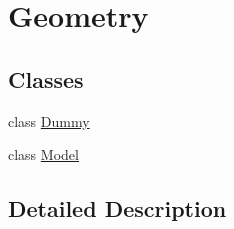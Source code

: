 \hypertarget{group__gr___geometry}{}\section{Geometry}
\label{group__gr___geometry}
\subsection*{Classes}
\begin{DoxyCompactItemize}
\item 
class \hyperlink{class_dummy}{Dummy}
\item 
class \hyperlink{class_model}{Model}
\end{DoxyCompactItemize}


\subsection{Detailed Description}
